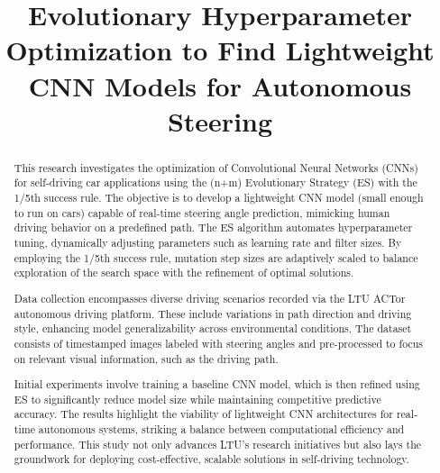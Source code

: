 \documentclass[conference]{IEEEtran}
\begin{document}
\title{Evolutionary Hyperparameter Optimization to Find Lightweight CNN Models for Autonomous Steering}

\author{
\and
{}
\and
{}
}

\maketitle

\begin{abstract}
    This research investigates the optimization of Convolutional Neural Networks (CNNs) for self-driving car applications using the (n+m) Evolutionary Strategy (ES) with the 1/5th success rule. The objective is to develop a lightweight CNN model (small enough to run on cars) capable of real-time steering angle prediction, mimicking human driving behavior on a predefined path. The ES algorithm automates hyperparameter tuning, dynamically adjusting parameters such as learning rate and filter sizes. By employing the 1/5th success rule, mutation step sizes are adaptively scaled to balance exploration of the search space with the refinement of optimal solutions.

    Data collection encompasses diverse driving scenarios recorded via the LTU ACTor autonomous driving platform. These include variations in path direction and driving style, enhancing model generalizability across environmental conditions. The dataset consists of timestamped images labeled with steering angles and pre-processed to focus on relevant visual information, such as the driving path.
    
    Initial experiments involve training a baseline CNN model, which is then refined using ES to significantly reduce model size while maintaining competitive predictive accuracy. The results highlight the viability of lightweight CNN architectures for real-time autonomous systems, striking a balance between computational efficiency and performance. This study not only advances LTU's research initiatives but also lays the groundwork for deploying cost-effective, scalable solutions in self-driving technology.
    
\end{abstract}
\end{document}
